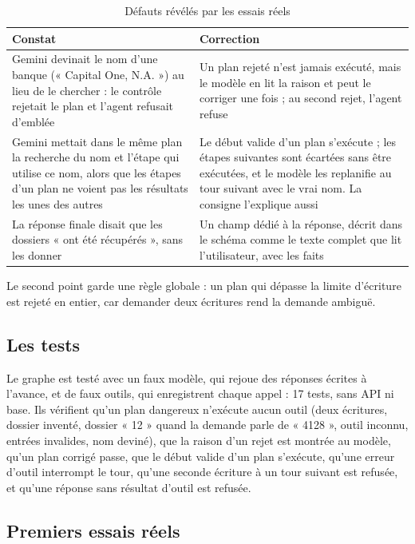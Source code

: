 \documentclass[11pt,a4paper]{article}
\begin{document}
\begin{table}[H]
\centering\small
\begin{tabularx}{\linewidth}{@{}Y Y@{}}
\toprule
Constat & Correction \\
\midrule
Gemini devinait le nom d'une banque (« Capital One, N.A. ») au lieu de le chercher : le contrôle rejetait le plan et l'agent refusait d'emblée & Un plan rejeté n'est jamais exécuté, mais le modèle en lit la raison et peut le corriger une fois ; au second rejet, l'agent refuse \\
Gemini mettait dans le même plan la recherche du nom et l'étape qui utilise ce nom, alors que les étapes d'un plan ne voient pas les résultats les unes des autres & Le début valide d'un plan s'exécute ; les étapes suivantes sont écartées sans être exécutées, et le modèle les replanifie au tour suivant avec le vrai nom. La consigne l'explique aussi \\
La réponse finale disait que les dossiers « ont été récupérés », sans les donner & Un champ dédié à la réponse, décrit dans le schéma comme le texte complet que lit l'utilisateur, avec les faits \\
\bottomrule
\end{tabularx}
\caption{Défauts révélés par les essais réels}
\end{table}

Le second point garde une règle globale : un plan qui dépasse la limite d'écriture est rejeté en entier, car demander deux écritures rend la demande ambiguë.

\subsection{Les tests}

Le graphe est testé avec un faux modèle, qui rejoue des réponses écrites à l'avance, et de faux outils, qui enregistrent chaque appel : 17 tests, sans API ni base. Ils vérifient qu'un plan dangereux n'exécute aucun outil (deux écritures, dossier inventé, dossier « 12 » quand la demande parle de « 4128 », outil inconnu, entrées invalides, nom deviné), que la raison d'un rejet est montrée au modèle, qu'un plan corrigé passe, que le début valide d'un plan s'exécute, qu'une erreur d'outil interrompt le tour, qu'une seconde écriture à un tour suivant est refusée, et qu'une réponse sans résultat d'outil est refusée.

\subsection{Premiers essais réels}
\end{document}
